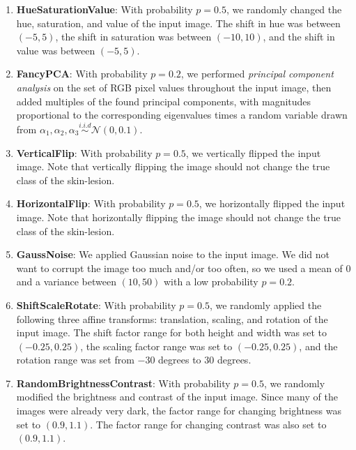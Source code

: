 \documentclass [MAS] {uclathes}
\begin{document}
\begin{enumerate}
    \item \textbf{HueSaturationValue}: With probability $p=0.5$, we randomly changed the hue, saturation, and value of the input image. The shift in hue was between $(-5, 5)$, the shift in saturation was between $(-10, 10)$, and the shift in value was between $(-5, 5)$.
    \item \textbf{FancyPCA}: With probability $p=0.2$, we performed \textit{principal component analysis} on the set of RGB pixel values throughout the input image, then added multiples of the found principal components, with magnitudes proportional to the corresponding eigenvalues times a random variable drawn from $\alpha_1, \alpha_2, \alpha_3 \stackrel{i.i.d}{\sim} \mathcal{N}(0, 0.1)$.
    \item \textbf{VerticalFlip}: With probability $p=0.5$, we vertically flipped the input image. Note that vertically flipping the image should not change the true class of the skin-lesion.
    \item \textbf{HorizontalFlip}: With probability $p=0.5$, we horizontally flipped the input image. Note that horizontally flipping the image should not change the true class of the skin-lesion.
    \item \textbf{GaussNoise}: We applied Gaussian noise to the input image. We did not want to corrupt the image too much and/or too often, so we used a mean of $0$ and a variance between $(10, 50)$ with a low probability $p=0.2$.
    \item \textbf{ShiftScaleRotate}: With probability $p=0.5$, we randomly applied the following three affine transforms: translation, scaling, and rotation of the input image. The shift factor range for both height and width was set to $(-0.25, 0.25)$, the scaling factor range was set to $(-0.25, 0.25)$, and the rotation range was set from $-30$ degrees to $30$ degrees. 
    \item \textbf{RandomBrightnessContrast}: With probability $p=0.5$, we randomly modified the brightness and contrast of the input image. Since many of the images were already very dark, the factor range for changing brightness was set to $(0.9, 1.1)$. The factor range for changing contrast was also set to $(0.9, 1.1)$.
\end{enumerate}
\end{document}
